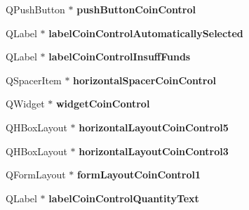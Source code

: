 \begin{DoxyCompactItemize}
\item 
\mbox{\label{class_ui___send_coins_dialog_aab39876df47463ebc2fc9cedb06531ef}} 
Q\+Push\+Button $\ast$ {\bfseries push\+Button\+Coin\+Control}
\item 
\mbox{\label{class_ui___send_coins_dialog_a3706730ad1a79a51d383a71ed10e7430}} 
Q\+Label $\ast$ {\bfseries label\+Coin\+Control\+Automatically\+Selected}
\item 
\mbox{\label{class_ui___send_coins_dialog_a8e18e23fd61dad749bf07081ad9d599a}} 
Q\+Label $\ast$ {\bfseries label\+Coin\+Control\+Insuff\+Funds}
\item 
\mbox{\label{class_ui___send_coins_dialog_a9d991f9efdb7853219e652f664d96277}} 
Q\+Spacer\+Item $\ast$ {\bfseries horizontal\+Spacer\+Coin\+Control}
\item 
\mbox{\label{class_ui___send_coins_dialog_ad9c5c44e78a9dee67e07ba1bb63e5839}} 
Q\+Widget $\ast$ {\bfseries widget\+Coin\+Control}
\item 
\mbox{\label{class_ui___send_coins_dialog_a79d6e206273addc57462ad5c00ea5601}} 
Q\+H\+Box\+Layout $\ast$ {\bfseries horizontal\+Layout\+Coin\+Control5}
\item 
\mbox{\label{class_ui___send_coins_dialog_a6657893e1080151ac7249f21a3ab7896}} 
Q\+H\+Box\+Layout $\ast$ {\bfseries horizontal\+Layout\+Coin\+Control3}
\item 
\mbox{\label{class_ui___send_coins_dialog_a7ae8a0303074c814ae0cd5d5e3846276}} 
Q\+Form\+Layout $\ast$ {\bfseries form\+Layout\+Coin\+Control1}
\item 
\mbox{\label{class_ui___send_coins_dialog_aa8862b1ecca0da75a77dd5a07d635f15}} 
Q\+Label $\ast$ {\bfseries label\+Coin\+Control\+Quantity\+Text}
\item 
\mbox{\label{class_ui___send_coins_dialog_a194a5e2f708e9e662da858d31e6988dd}} 

\end{DoxyCompactItemize}
